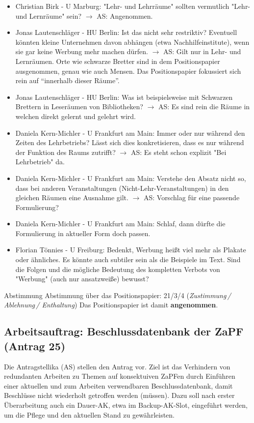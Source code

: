     \begin{itemize}
      \item Christian Birk - U Marburg:  "Lehr- und Lehrräume" sollten vermutlich "Lehr- und Lernräume" sein?
        $\rightarrow$ AS: Angenommen.
      \item Jonas Lautenschläger - HU Berlin:  Ist das nicht sehr restriktiv? Eventuell könnten kleine Unternehmen davon abhängen (etwa Nachhilfeinstitute), wenn sie gar keine Werbung mehr machen dürfen.
        $\rightarrow$ AS: Gilt nur in Lehr- und Lernräumen. Orte wie schwarze Bretter sind in dem Positionspapier ausgenommen, genau wie auch Mensen. Das Positionspapier fokussiert sich rein auf ``innerhalb dieser Räume''.
      \item Jonas Lautenschläger - HU Berlin:  Was ist beispielsweise mit Schwarzen Brettern in Leseräumen von Bibliotheken?
        $\rightarrow$ AS: Es sind rein die Räume in welchen direkt gelernt und gelehrt wird.
      \item Daniela Kern-Michler - U Frankfurt am Main:  Immer oder nur während den Zeiten des Lehrbetriebs? Lässt sich dies konkretisieren, dass es nur während der Funktion des Raums zutrifft?
        $\rightarrow$ AS: Es steht schon explizit "Bei Lehrbetrieb" da.
      \item Daniela Kern-Michler - U Frankfurt am Main:  Verstehe den Absatz nicht so, dass bei anderen Veranstaltungen (Nicht-Lehr-Veranstaltun\-gen) in den gleichen Räumen eine Ausnahme gilt.
        $\rightarrow$ AS: Vorschlag für eine passende Formulierung?
      \item Daniela Kern-Michler - U Frankfurt am Main:  Schlaf, dann dürfte die Formulierung in aktueller Form doch passen.
      \item Florian Tönnies - U Freiburg:  Bedenkt, Werbung heißt viel mehr als Plakate oder ähnliches. Es könnte auch subtiler sein als die Beispiele im Text. Sind die Folgen und die mögliche Bedeutung des kompletten Verbots von "Werbung" (auch nur ansatzweiße) bewusst?
    \end{itemize}

    \begin{success}{Abstimmung}
      Abstimmung über das Positionspapier: 21/3/4 (\textit{Zustimmung\,/ Ablehnung\,/ Enthaltung})
      Das Positionspapier ist damit \textbf{angenommen}.
    \end{success}

    \subsection*{Arbeitsauftrag: Beschlussdatenbank der ZaPF (Antrag 25)}
    Die Antragstellika (AS) stellen den Antrag vor.
    Ziel ist das Verhindern von redundanten Arbeiten zu Themen auf konsektuiven ZaPFen durch Einführen einer aktuellen und zum Arbeiten verwendbaren Beschlussdatenbank, damit Beschlüsse nicht wiederholt getroffen werden (müssen).
    Dazu soll nach erster Überarbeitung auch ein Dauer-AK, etwa im Backup-AK-Slot, eingeführt werden, um die Pflege und den aktuellen Stand zu gewährleisten.

